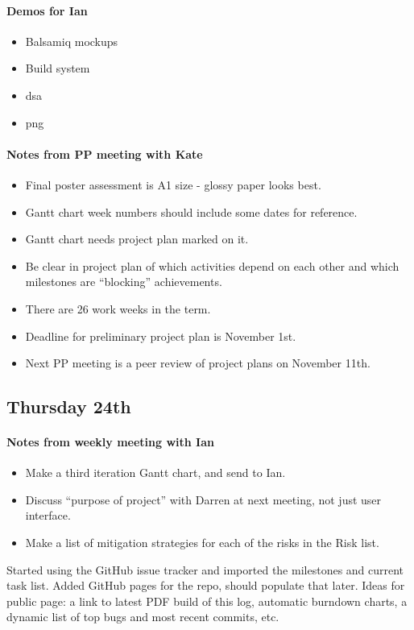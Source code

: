 \paragraph{Demos for Ian}
\begin{itemize}
\item Balsamiq mockups
\item Build system
\item dsa
\item png
\end{itemize}

\paragraph{Notes from PP meeting with Kate}
\begin{itemize}
\item Final poster assessment is A1 size - glossy paper looks best.
\item Gantt chart week numbers should include some dates for reference.
\item Gantt chart needs project plan marked on it.
\item Be clear in project plan of which activities depend on each other and
  which milestones are ``blocking'' achievements.
\item There are 26 work weeks in the term.
\item Deadline for preliminary project plan is November 1st.
\item Next PP meeting is a peer review of project plans on November 11th.
\end{itemize}

\subsection{Thursday 24th}
\paragraph{Notes from weekly meeting with Ian}
\begin{itemize}
\item Make a third iteration Gantt chart, and send to Ian.
\item Discuss ``purpose of project'' with Darren at next meeting, not just user
  interface.
\item Make a list of mitigation strategies for each of the risks in the Risk
  list.
\end{itemize}

\noindent
Started using the GitHub issue tracker and imported the milestones and current
task list. Added GitHub pages for the repo, should populate that later. Ideas
for public page: a link to latest PDF build of this log, automatic burndown
charts, a dynamic list of top bugs and most recent commits, etc.

